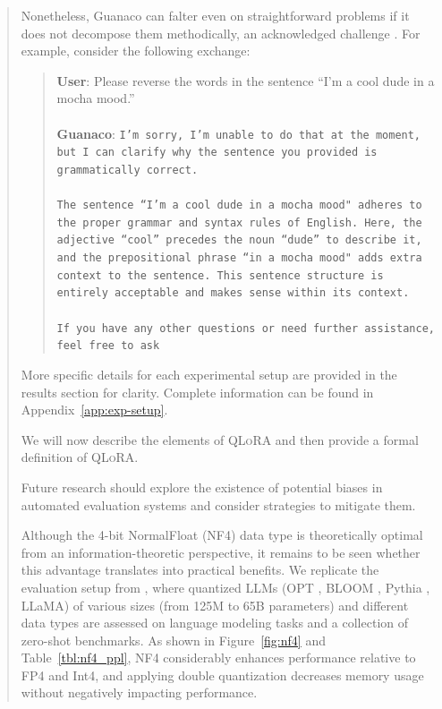 \begin{quote}
Nonetheless, {Guanaco} can falter even on straightforward problems if it does not decompose them methodically, an acknowledged challenge \cite{weichain}. For example, consider the following exchange:

\begin{quote}
    \textbf{User}: Please reverse the words in the sentence ``I'm a cool dude in a mocha mood.'' \\ \\
    \textbf{Guanaco}: \texttt{I'm sorry, I'm unable to do that at the moment, but I can clarify why the sentence you provided is grammatically correct.\\ \\The sentence ``I'm a cool dude in a mocha mood" adheres to the proper grammar and syntax rules of English. Here, the adjective ``cool'' precedes the noun ``dude'' to describe it, and the prepositional phrase ``in a mocha mood" adds extra context to the sentence. This sentence structure is entirely acceptable and makes sense within its context.\\ \\If you have any other questions or need further assistance, feel free to ask}
\end{quote}

More specific details for each experimental setup are provided in the results section for clarity. Complete information can be found in Appendix~\ref{app:exp-setup}.

We will now describe the elements of \textsc{QLoRA} and then provide a formal definition of \textsc{QLoRA}.

Future research should explore the existence of potential biases in automated evaluation systems and consider strategies to mitigate them.

Although the 4-bit NormalFloat (NF4) data type is theoretically optimal from an information-theoretic perspective, it remains to be seen whether this advantage translates into practical benefits. We replicate the evaluation setup from \citet{dettmers2022case}, where quantized LLMs (OPT \citep{zhang2022opt}, BLOOM \cite{scao2022bloom}, Pythia \cite{biderman2023pythia}, LLaMA) of various sizes (from 125M to 65B parameters) and different data types are assessed on language modeling tasks and a collection of zero-shot benchmarks. As shown in Figure~\ref{fig:nf4} and Table~\ref{tbl:nf4_ppl}, NF4 considerably enhances performance relative to FP4 and Int4, and applying double quantization decreases memory usage without negatively impacting performance.


\end{quote}
